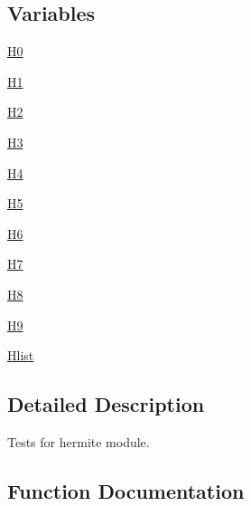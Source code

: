 \subsection*{Variables}
\begin{DoxyCompactItemize}
\item 
\hyperlink{namespacenumpy_1_1polynomial_1_1tests_1_1test__hermite_a7c2844c2ec22283ebd4416a2d70547b6}{H0}
\item 
\hyperlink{namespacenumpy_1_1polynomial_1_1tests_1_1test__hermite_ac98c56a3f8eee44cffe5ecfba2b18c3c}{H1}
\item 
\hyperlink{namespacenumpy_1_1polynomial_1_1tests_1_1test__hermite_a6208d44672cce959b36353ea8b041bf8}{H2}
\item 
\hyperlink{namespacenumpy_1_1polynomial_1_1tests_1_1test__hermite_aa118a1b863b6a84373104ec3085a0ebc}{H3}
\item 
\hyperlink{namespacenumpy_1_1polynomial_1_1tests_1_1test__hermite_a30b9530634f1c1eea89a8ad3a5af8fbb}{H4}
\item 
\hyperlink{namespacenumpy_1_1polynomial_1_1tests_1_1test__hermite_a7ec2467711a0989f53eefc4ffb000791}{H5}
\item 
\hyperlink{namespacenumpy_1_1polynomial_1_1tests_1_1test__hermite_a984ef285286acccf6debd6603d4e0f93}{H6}
\item 
\hyperlink{namespacenumpy_1_1polynomial_1_1tests_1_1test__hermite_a2570c55d7525a6c71ebee57f544b717a}{H7}
\item 
\hyperlink{namespacenumpy_1_1polynomial_1_1tests_1_1test__hermite_a0dd65980ea76d25b8a68b9324c02c71a}{H8}
\item 
\hyperlink{namespacenumpy_1_1polynomial_1_1tests_1_1test__hermite_ac5f1ea693c777919ae03994c86a63259}{H9}
\item 
\hyperlink{namespacenumpy_1_1polynomial_1_1tests_1_1test__hermite_aa503259268593b6afc8f25809ad6638c}{Hlist}
\end{DoxyCompactItemize}


\subsection{Detailed Description}
\begin{DoxyVerb}Tests for hermite module.\end{DoxyVerb}
 

\subsection{Function Documentation}
\mbox{\label{namespacenumpy_1_1polynomial_1_1tests_1_1test__hermite_a3535069b86529b44e2e10ced60b692be}} 
